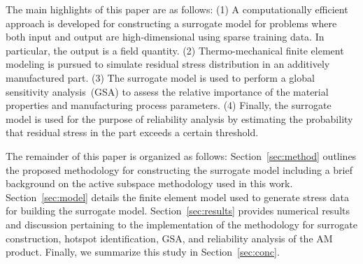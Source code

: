 The main highlights of this paper are as follows: (1) A computationally efficient approach is developed
for constructing a surrogate model for problems where both input and output are high-dimensional using
sparse training data.
In particular, the output is a field quantity. 
(2) Thermo-mechanical finite element modeling is pursued to simulate residual stress distribution
in an additively manufactured part.
 (3) The surrogate model is used to perform a global
sensitivity analysis~(GSA) to assess the relative importance of the material properties and manufacturing process parameters.
(4) Finally, the surrogate model is used for the purpose of reliability analysis by estimating the
probability that residual stress in the part exceeds a certain threshold.

The remainder of this paper is organized as follows: Section~\ref{sec:method} outlines the proposed methodology for
constructing the surrogate model including a brief background on the active subspace methodology used in this work.
Section~\ref{sec:model} details the finite element model used to generate stress data for building the surrogate model.
Section~\ref{sec:results} provides numerical results and discussion pertaining to the implementation of the methodology 
for surrogate construction, hotspot identification, GSA, and 
reliability analysis of the AM product. 
Finally, we summarize this study in Section~\ref{sec:conc}. 




